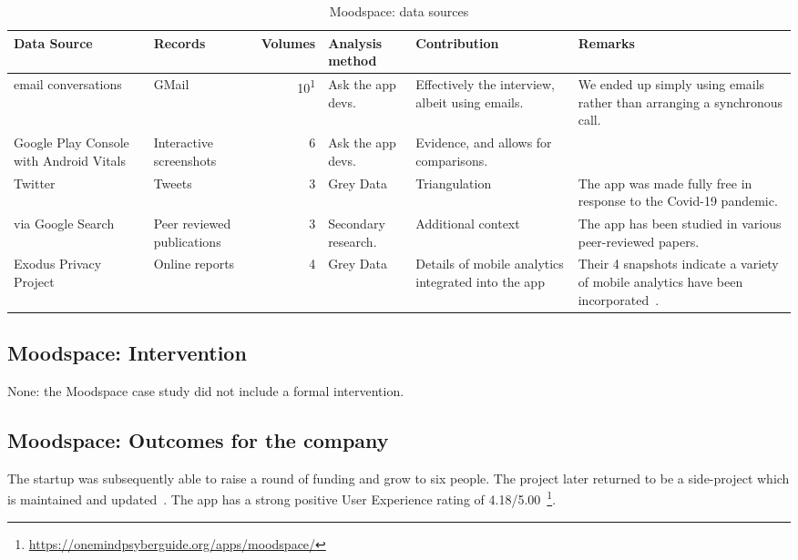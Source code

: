 \begin{table}
    \centering
    \footnotesize
    \tabcolsep=0.12cm
    \begin{tabular}{p{2.3cm}p{2.1cm}rp{2.4cm}p{2.8cm}p{3.2cm}}
        Data Source & Records & Volumes & Analysis method & Contribution & Remarks \\
        \toprule
         email conversations & GMail & 10\textsuperscript{1} & Ask the app devs. & Effectively the interview, albeit using emails.  & We ended up simply using emails rather than arranging a synchronous call.  \\
         Google Play Console with Android Vitals &Interactive screenshots & 6 & Ask the app devs. & Evidence, and allows for comparisons. &  \\
         Twitter &Tweets & 3 & Grey Data & Triangulation & The app was made fully free in response to the Covid-19 pandemic. \\
         via Google Search &Peer reviewed publications & 3 & Secondary research. &Additional context &The app has been studied in various peer-reviewed papers. \\ 
         Exodus Privacy Project & Online reports & 4 & Grey Data & Details of mobile analytics integrated into the app & Their 4 snapshots indicate a variety of mobile analytics have been incorporated~\footnotemark. \\
         \bottomrule
    \end{tabular}
    \caption{Moodspace: data sources}
    \label{tab:moodspace-data-sources}
\end{table}



\subsection{Moodspace: Intervention}
None: the Moodspace case study did not include a formal intervention.

\subsection{Moodspace: Outcomes for the company}
The startup was subsequently able to raise a round of funding and grow to six people. The project later returned to be a side-project which is maintained and updated~\citep{alexander2021_linkedin_profile}. %
The app has a strong positive User Experience rating of 4.18/5.00~\footnote{\url{https://onemindpsyberguide.org/apps/moodspace/}}.


